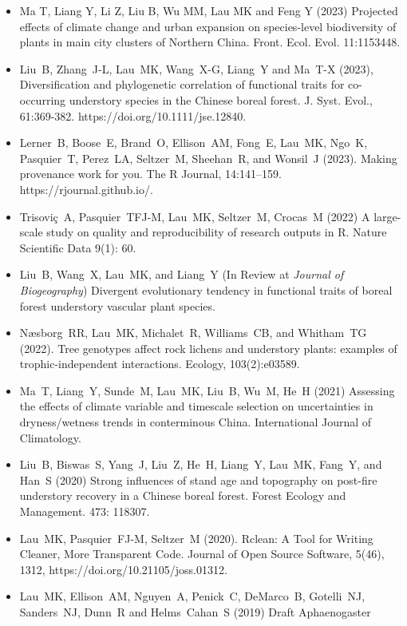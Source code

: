 \documentclass[a4paper]{article}
\begin{document}
\begin{itemize}

\item Ma T, Liang Y, Li Z, Liu B, Wu MM, Lau MK and Feng Y (2023)
  Projected effects of climate change and urban expansion on
  species-level biodiversity of plants in main city clusters of
  Northern China.  Front. Ecol. Evol. 11:1153448. 
\item Liu~B, Zhang~J-L, Lau~MK, Wang~X-G, Liang~Y and Ma~T-X (2023),
  Diversification and phylogenetic correlation of functional traits
  for co-occurring understory species in the Chinese boreal
  forest. J. Syst. Evol., 61:369-382. https://doi.org/10.1111/jse.12840.
\item Lerner~B, Boose~E, Brand~O, Ellison~AM, Fong~E, Lau~MK, Ngo~K,
  Pasquier~T, Perez~LA, Seltzer~M, Sheehan~R, and Wonsil~J
  (2023). Making provenance work for you. The R Journal,
  14:141–159. https://rjournal.github.io/.
\item Trisoviç~A, Pasquier~TFJ-M, Lau~MK, Seltzer~M, Crocas~M (2022)
  A large-scale study on quality and reproducibility of research
  outputs in R. Nature Scientific Data 9(1): 60. 
\item Liu~B, Wang~X, Lau~MK, and Liang~Y (In Review at \textit{Journal
  of Biogeography}) Divergent evolutionary tendency in functional
  traits of boreal forest understory vascular plant species.
\item Næsborg~RR, Lau~MK, Michalet~R, Williams~CB,
  and Whitham~TG (2022). Tree genotypes affect rock lichens and
  understory plants: examples of trophic-independent
  interactions. Ecology, 103(2):e03589.
\item Ma~T, Liang~Y, Sunde~M, Lau~MK, Liu~B, Wu~M, He~H (2021)
  Assessing the effects of climate variable and timescale selection on
  uncertainties in dryness/wetness trends in conterminous
  China. International Journal of Climatology.
\item Liu~B, Biswas~S, Yang~J, Liu~Z, He~H, Liang~Y, Lau~MK, Fang~Y,
  and Han~S (2020) Strong influences of stand age and topography on
  post-fire understory recovery in a Chinese boreal forest. Forest
  Ecology and Management. 473: 118307.
\item Lau~MK, Pasquier~FJ-M, Seltzer~M (2020). Rclean: A Tool for
  Writing Cleaner, More Transparent Code. Journal of Open Source
  Software, 5(46), 1312, https://doi.org/10.21105/joss.01312.
\item  Lau~MK, Ellison~AM, Nguyen~A, Penick~C, DeMarco~B, Gotelli~NJ,
  Sanders~NJ, Dunn~R and Helms~Cahan~S (2019) Draft Aphaenogaster

\end{itemize}
\end{document}
